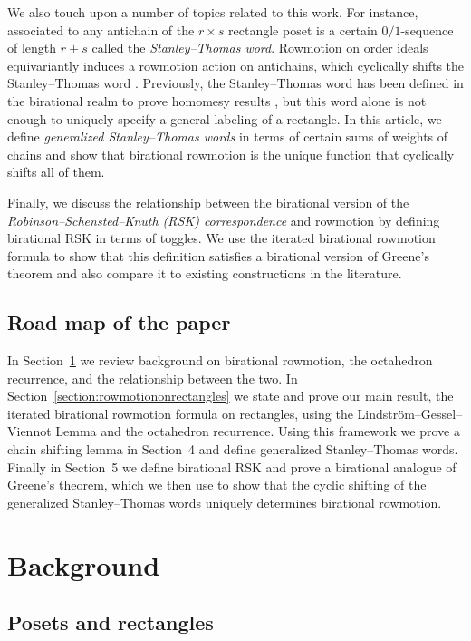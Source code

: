 \documentclass[11pt]{article}
\theoremstyle{definition}
\numberwithin{equation}{section}
\numberwithin{equation}{section}
\begin{document}
We also touch upon a number of topics related to this work. For instance, associated to any antichain of the $r \times s$ rectangle poset is a certain $0/1$-sequence of length $r+s$ called the \emph{Stanley--Thomas word}. Rowmotion on order ideals equivariantly induces a rowmotion action on antichains, which cyclically shifts the Stanley--Thomas word \cite{propproby,stanley1}. Previously, the Stanley--Thomas word has been defined in the birational realm to prove homomesy results \cite{josephroby1}, but this word alone is not enough to uniquely specify a general labeling of a rectangle. In this article, we define \emph{generalized Stanley--Thomas words} in terms of certain sums of weights of chains and show that birational rowmotion is the unique function that cyclically shifts all of them. 

Finally, we discuss the relationship between the birational version of the \emph{Robinson--Schensted--Knuth (RSK) correspondence} \cite{danilovkoshevoy, noumiyamada} and rowmotion by defining birational RSK in terms of toggles. We use the iterated birational rowmotion formula to show that this definition satisfies a birational version of Greene's theorem and also compare it to existing constructions in the literature.

\subsection*{Road map of the paper} In Section~\ref{section:background} we review background on birational rowmotion, the octahedron recurrence, and the relationship between the two. In Section~\ref{section:rowmotiononrectangles} we state and prove our main result, the iterated birational rowmotion formula on rectangles, using the Lindstr\"om--Gessel--Viennot Lemma and the octahedron recurrence. Using this framework we prove a chain shifting lemma in Section~4 and define generalized Stanley--Thomas words. Finally in Section~5 we define birational RSK and prove a birational analogue of Greene's theorem, which we then use to show that the cyclic shifting of the generalized Stanley--Thomas words uniquely determines birational rowmotion.

\section{Background} \label{section:background}

\subsection{Posets and rectangles}
\label{subsection:posets}
\end{document}
